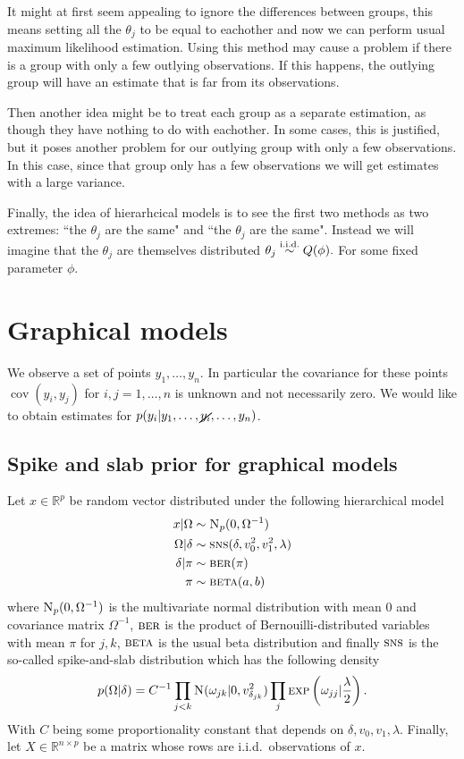 \documentclass{scrartcl}
\DeclareMathOperator{\cov}{cov}
\newcommand{\iid}{\stackrel{\textmd{i.i.d.}}{\sim}}
\newcommand{\R}{\mathbb{R}}
\newcommand{\inv}{^{-1}}
\newcommand{\Np}{\textsc{N}_p}
\newcommand{\Nor}{\textsc{N}}
\newcommand{\sns}{\textsc{sns}}
\newcommand{\ber}{\textsc{ber}}
\newcommand{\beeta}{\textsc{beta}}
\newcommand{\Exp}{\textsc{exp}}
\begin{document}
It might at first seem appealing to ignore the differences between groups, this
means setting all the $\theta_j$ to be equal to eachother and now we can
perform usual maximum likelihood estimation. Using this method may cause a
problem if there is a group with only a few outlying observations. If this
happens, the outlying group will have an estimate that is far from its
observations.

Then another idea might be to treat each group as a separate estimation, as
though they have nothing to do with eachother. In some cases, this is
justified, but it poses another problem for our outlying group with only a few
observations. In this case, since that group only has a few observations we
will get estimates with a large variance.

Finally, the idea of hierarhcical models is to see the first two methods as two
extremes: ``the $\theta_j$ are the same" and ``the $\theta_j$ are the same".
Instead we will imagine that the $\theta_j$ are themselves distributed $\theta_j \iid Q(\phi).$ For some fixed parameter $\phi.$

\section{Graphical models}
We observe a set of points $y_1, \dots, y_n$.
In particular the covariance for these points $\cov(y_i, y_j)$ for $i,j = 1,\dots,
	n$ is unknown and not necessarily zero.
We would like to obtain estimates for $p(y_i | y_1,\dots, \cancel{y_i},\dots, y_n)$.

\subsection{Spike and slab prior for graphical models}
Let $x \in \R^p$ be random vector distributed under the following hierarchical model
\begin{align*}
	x | \Omega      & \sim \Np(0, \Omega\inv)                  \\
	\Omega | \delta & \sim \sns(\delta, v_0^2, v_1^2, \lambda) \\
	\delta | \pi    & \sim \ber(\pi)                           \\
	\pi             & \sim \beeta(a,b)
\end{align*}
where $\Np(0, \Omega\inv)$ is the multivariate normal distribution with mean $0$ and
covariance matrix $\Omega\inv$, $\ber$ is the product of Bernouilli-distributed variables with mean $\pi$ for $j,k$, %
$\beeta$ is the usual beta distribution and finally $\sns$ is the so-called spike-and-slab
distribution which has the following density
\[p(\Omega | \delta) = C\inv \prod_{j < k}  \Nor(\omega_{jk} | 0,
	v_{\delta_{jk}}^2) \prod_j \Exp\left(\omega_{jj} | \frac{\lambda}{2}\right).\]
With $C$ being some proportionality constant that depends on $\delta, v_0, v_1, \lambda$.
Finally, let $X \in \R^{n \times p}$ be a matrix whose rows are i.i.d.\ observations of $x$.
\end{document}

